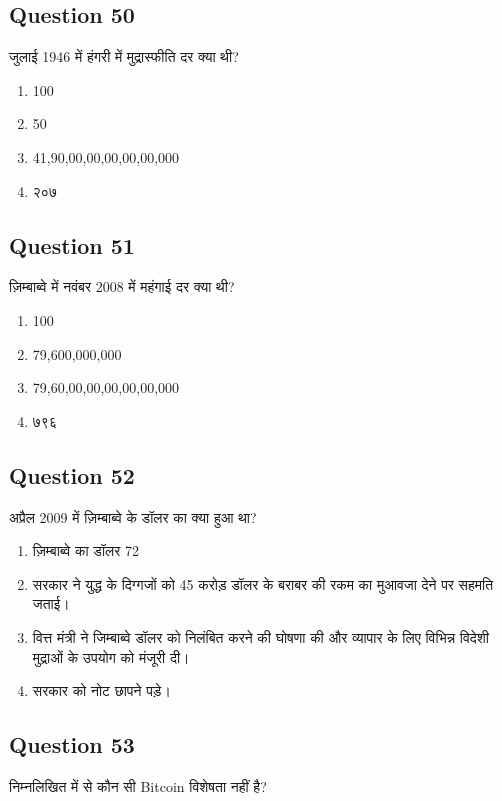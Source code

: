 \documentclass[12pt,a4paper]{article}
\begin{document}
\bigskip


\subsection*{Question 50}
जुलाई 1946 में हंगरी में मुद्रास्फीति दर क्या थी?

\begin{enumerate}[label=\Alph*., leftmargin=*]
\item 100%
\item 50%
\item 41,90,00,00,00,00,00,000%
\item २०७%
\end{enumerate}

\bigskip


\subsection*{Question 51}
ज़िम्बाब्वे में नवंबर 2008 में महंगाई दर क्या थी?

\begin{enumerate}[label=\Alph*., leftmargin=*]
\item 100%
\item 79,600,000,000%
\item 79,60,00,00,00,00,00,000%
\item ७९६%
\end{enumerate}

\bigskip


\subsection*{Question 52}
अप्रैल 2009 में ज़िम्बाब्वे के डॉलर का क्या हुआ था?

\begin{enumerate}[label=\Alph*., leftmargin=*]
\item ज़िम्बाब्वे का डॉलर 72%
\item सरकार ने युद्ध के दिग्गजों को 45 करोड़ डॉलर के बराबर की रकम का मुआवजा देने पर सहमति जताई।
\item वित्त मंत्री ने जिम्बाब्वे डॉलर को निलंबित करने की घोषणा की और व्यापार के लिए विभिन्न विदेशी मुद्राओं के उपयोग को मंजूरी दी।
\item सरकार को नोट छापने पड़े।
\end{enumerate}

\bigskip


\subsection*{Question 53}
निम्नलिखित में से कौन सी Bitcoin विशेषता नहीं है?
\end{document}
